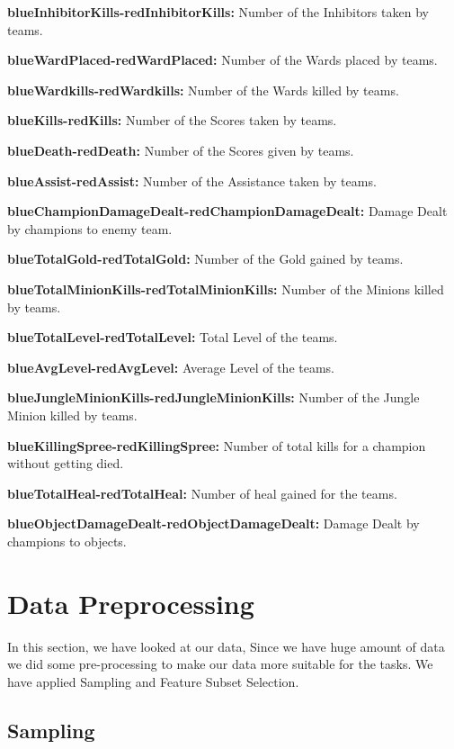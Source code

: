 \documentclass[a4paper]{article}
\begin{document}
\textbf{blueInhibitorKills-redInhibitorKills:} 
Number of the Inhibitors taken by teams.

\textbf{blueWardPlaced-redWardPlaced:} 
Number of the Wards placed by teams.

\textbf{blueWardkills-redWardkills:} 
Number of the Wards killed by teams.

\textbf{blueKills-redKills:} 
Number of the Scores taken by teams.

\textbf{blueDeath-redDeath:} 
Number of the Scores given by teams.

\textbf{blueAssist-redAssist:} 
Number of the Assistance taken by teams.

\textbf{blueChampionDamageDealt-redChampionDamageDealt:} 
Damage Dealt by champions to enemy team.

\textbf{blueTotalGold-redTotalGold:} 
Number of the Gold gained by teams.

\textbf{blueTotalMinionKills-redTotalMinionKills:} 
Number of the Minions killed by teams.

\textbf{blueTotalLevel-redTotalLevel:} 
Total Level of the teams.

\textbf{blueAvgLevel-redAvgLevel:} 
Average Level of the teams.

\textbf{blueJungleMinionKills-redJungleMinionKills:} 
Number of the Jungle Minion killed by teams.

\textbf{blueKillingSpree-redKillingSpree:} 
Number of total kills for a champion without getting died.

\textbf{blueTotalHeal-redTotalHeal:} 
Number of heal gained for the teams.

\textbf{blueObjectDamageDealt-redObjectDamageDealt:} 
Damage Dealt by champions to objects.

 
\bigskip
 

\pagebreak

\section{Data Preprocessing}

In this section, we have looked at our data, Since we have huge amount of data we did some pre-processing to make our data more suitable for the tasks. We have applied Sampling and Feature Subset Selection.

\subsection{Sampling}
\end{document}
